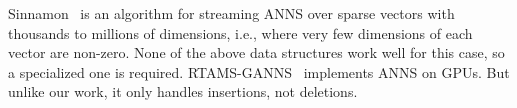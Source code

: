 Sinnamon~\cite{BruchNIL24} is an algorithm for streaming ANNS over sparse vectors with thousands to millions of dimensions, i.e., where very few dimensions of each vector are non-zero.
None of the above data structures work well for this case, so a specialized one is required.
RTAMS-GANNS~\cite{YipingSunEtAl24} implements ANNS on GPUs.
But unlike our work, it only handles insertions, not deletions. 

